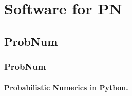 \documentclass[10pt,usepdftitle=false,aspectratio=169]{beamer}
\begin{document}
\section{Software for PN}

\subsection{ProbNum}

\begin{frame}\frametitle{ProbNum}
	\framesubtitle{Probabilistic Numerics in Python.}
	\vspace{-0.35em}
\end{frame}
\end{document}
